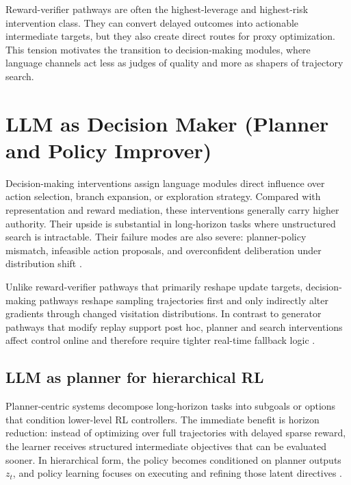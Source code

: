 ﻿\documentclass[conference]{IEEEtran}
\begin{document}
Reward-verifier pathways are often the highest-leverage and highest-risk intervention class. They can convert delayed outcomes into actionable intermediate targets, but they also create direct routes for proxy optimization. This tension motivates the transition to decision-making modules, where language channels act less as judges of quality and more as shapers of trajectory search.
\section{LLM as Decision Maker (Planner and Policy Improver)}
Decision-making interventions assign language modules direct influence over action selection, branch expansion, or exploration strategy. Compared with representation and reward mediation, these interventions generally carry higher authority. Their upside is substantial in long-horizon tasks where unstructured search is intractable. Their failure modes are also severe: planner-policy mismatch, infeasible action proposals, and overconfident deliberation under distribution shift \cite{arxiv_p_2204_01691,arxiv_p_2305_16291,arxiv_p_2405_01534,arxiv_p_2602_16165,arxiv_p_2602_07848,arxiv_p_2602_11551,arxiv_p_2512_16848}.

Unlike reward-verifier pathways that primarily reshape update targets, decision-making pathways reshape sampling trajectories first and only indirectly alter gradients through changed visitation distributions. In contrast to generator pathways that modify replay support post hoc, planner and search interventions affect control online and therefore require tighter real-time fallback logic \cite{arxiv_p_2310_12931,arxiv_p_2602_06493,arxiv_p_2310_20587,arxiv_p_2601_08107}.

\subsection{LLM as planner for hierarchical RL}
Planner-centric systems decompose long-horizon tasks into subgoals or options that condition lower-level RL controllers. The immediate benefit is horizon reduction: instead of optimizing over full trajectories with delayed sparse reward, the learner receives structured intermediate objectives that can be evaluated sooner. In hierarchical form, the policy becomes conditioned on planner outputs $z_t$, and policy learning focuses on executing and refining those latent directives \cite{arxiv_p_2204_01691,arxiv_p_2305_16291,arxiv_p_2405_01534,arxiv_p_2602_16165}.
\end{document}
